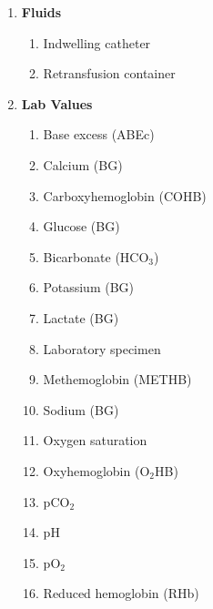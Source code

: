 \begin{enumerate}
    \item \textbf{Fluids}
          \begin{enumerate}
              \item Indwelling catheter
              \item Retransfusion container
          \end{enumerate}

    \item \textbf{Lab Values}
          \begin{enumerate}
              \item Base excess (ABEc)
              \item Calcium (BG)
              \item Carboxyhemoglobin (COHB)
              \item Glucose (BG)
              \item Bicarbonate (HCO$_3$)
              \item Potassium (BG)
              \item Lactate (BG)
              \item Laboratory specimen
              \item Methemoglobin (METHB)
              \item Sodium (BG)
              \item Oxygen saturation
              \item Oxyhemoglobin (O$_2$HB)
              \item pCO$_2$
              \item pH
              \item pO$_2$
              \item Reduced hemoglobin (RHb)
          \end{enumerate}


\end{enumerate}
